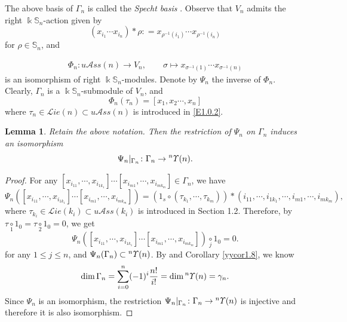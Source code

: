 \documentclass{amsart}
\newtheorem{lem}[thm]{Lemma}
\theoremstyle{definition}
\theoremstyle{remark}
\numberwithin{equation}{section}
\def\S{\mathbb{S}}
\newcommand{\ucr}[1]{\underset{#1}{\circ}}
\newcommand{\up}[1]{{^{#1}{\it \!\Upsilon}}}
\def \uas{u\mathcal{A}ss}
\def \Lie{\mathcal{L}ie}
\def \dim{\operatorname{dim}}
\def \S{\mathbb{S}}
\begin{document}

The above basis of $\Gamma_n$ is called the 
\textit{Specht basis} \cite[p.45]{Dr}. Observe that
$V_n$ admits the right $\Bbbk\S_n$-action given by
\[(x_{i_1}\cdots x_{i_n})\ast \rho\colon
=x_{\rho^{-1}(i_1)} \cdots x_{\rho^{-1}(i_n)}\]
for $\rho\in \S_n$, and

\begin{align}
\label{E3.1.1}\tag{E3.1.1}
\Phi_n\colon \uas(n)  \to V_n , \quad \quad 
\sigma \mapsto x_{\sigma^{-1}(1)}\cdots 
x_{\sigma^{-1}(n)}
\end{align}
is an isomorphism of right $\Bbbk\S_n$-modules. 
Denote by $\Psi_n$ the inverse of $\Phi_n$. Clearly, 
$\Gamma_n$ is a $\Bbbk\S_n$-submodule of $V_n$, and 
\[\Phi_n(\tau_n)=[x_1, x_2 \cdots, x_n]\]
where $\tau_{n}\in \Lie(n)\subset \uas(n)$ is 
introduced in \eqref{E1.0.2}.

\begin{lem}
\label{yylem3.2}
Retain the above notation. Then the restriction 
of $\Psi_n$ on $\Gamma_n$ induces an isomorphism 
\[\Psi_n|_{\Gamma_n}\colon  \Gamma_n \to \up{n}(n).\]
\end{lem}

\begin{proof}
For any $[x_{i_{11}}, \cdots, x_{i_{1k_1}}]\cdots
[x_{i_{m1}}, \cdots, x_{i_{mk_m}}]\in \Gamma_n$, we have 
\[\Psi_n([x_{i_{11}}, \cdots, x_{i_{1k_1}}]\cdots[x_{i_{m1}}, 
\cdots, x_{i_{mk_m}}])=(1_s\circ(\tau_{k_1}, \cdots, 
\tau_{k_m}))\ast 
(i_{11}, \cdots, i_{1k_1},\cdots, i_{m1}, \cdots, i_{mk_m}),\]
where $\tau_{k_i}\in \Lie(k_i)\subset \uas(k_i)$ is 
introduced in Section 1.2.
Therefore, by $\tau\ucr{1}1_0=\tau\ucr{2} 1_0=0$, we get 
\[\Psi_n([x_{i_{11}}, \cdots, x_{i_{1k_1}}]
\cdots[x_{i_{m1}}, \cdots, x_{i_{mk_m}}])\ucr{j} 1_0=0.\]
for any $1\le j\le n$, and $\Psi_n(\Gamma_n)\subset \up{n}(n)$.  
By \cite[Theorem 14]{Sp} and Corollary \ref{yycor1.8}, we know
\[\dim \Gamma_n=\sum\limits_{i=0}^n(-1)^i\dfrac{n!}{i!}
=\dim\up{n}(n) =\gamma_n.\]
Since $\Psi_n$ is an isomorphism, the restriction 
$\Psi_n|_{\Gamma_n}\colon \Gamma_n \to \up{n}(n)$ is injective 
and therefore it is also isomorphism.
\end{proof}
\end{document}
